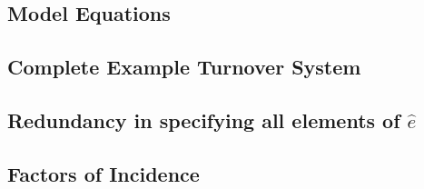 
\subsection{Model Equations}\label{aa:eqs-model}
\subsection{Complete Example Turnover System}\label{aa:eqs-turnover}

\subsection{Redundancy in specifying all elements of $\hat{e}$}\label{aa:eqs-e-redundant}

\subsection{Factors of Incidence}\label{aa:eqs-incidence}

